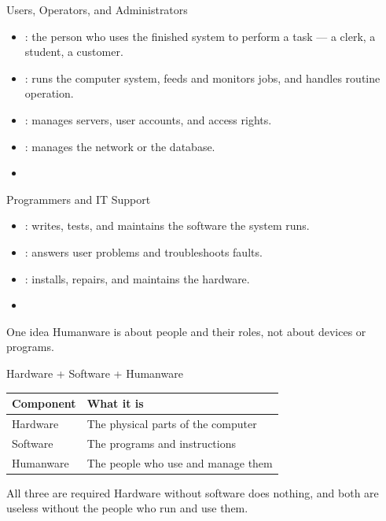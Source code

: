 \documentclass[aspectratio=169]{beamer}
\begin{document}
\begin{frame}{Users, Operators, and Administrators}
  \begin{itemize}
    \item {}: the person who uses the finished system to
      perform a task --- a clerk, a student, a customer.
    \item {}: runs the computer system, feeds and monitors jobs,
      and handles routine operation.
    \item {}: manages servers, user accounts, and
      access rights.
    \item {}: manages the network or the
      database.
    \item {}
  \end{itemize}
\end{frame}

\begin{frame}{Programmers and IT Support}
  \begin{itemize}
    \item {}: writes, tests, and maintains the
      software the system runs.
    \item {}: answers user problems and
      troubleshoots faults.
    \item {}: installs, repairs, and maintains the hardware.
    \item {}
  \end{itemize}
  \begin{block}{One idea}
    Humanware is about people and their roles, not about devices or programs.
  \end{block}
\end{frame}

\begin{frame}{Hardware + Software + Humanware}
  \begin{center}
    \begin{tabular}{p{}p{}}
      \toprule
      \textbf{Component} & \textbf{What it is} \\
      \midrule
      Hardware & The physical parts of the computer \\
      Software & The programs and instructions \\
      Humanware & The people who use and manage them \\
      \bottomrule
    \end{tabular}
  \end{center}
  \vspace{0.3cm}
  \begin{block}{All three are required}
    Hardware without software does nothing, and both are useless without the
    people who run and use them.
  \end{block}
\end{frame}
\end{document}
